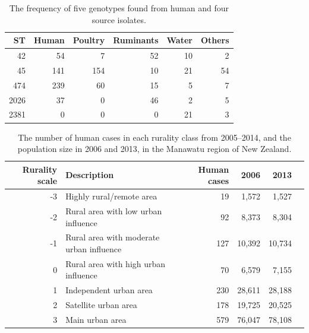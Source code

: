 \documentclass[AMA,STIX1COL]{WileyNJD-v2}
\begin{document}
\begin{table}
  \begin{center}
    \begin{tabular}{rrrrrr}
      \toprule
      ST & Human & Poultry & Ruminants & Water & Others\\ \midrule
      42 & 54 & 7 & 52 & 10 & 2\\
      45  & 141 & 154 & 10 & 21 & 54\\
      474 & 239 & 60 & 15 & 5 & 7\\
      2026 & 37 & 0 & 46 & 2 & 5\\
      2381 & 0 & 0 & 0 & 21 & 3\\
      \bottomrule
    \end{tabular}
  \end{center}
  \caption{The frequency of five genotypes found from human and four source isolates.}
  \label{tab:counts}
\end{table}

\begin{table}
  \centering
      \begin{tabular}{rlrrrr}
        \toprule
        Rurality scale & Description & Human cases & 2006 & 2013 \\ \midrule
        -3 & Highly rural/remote area & 19 & 1,572 & 1,527\\
        -2 & Rural area with low urban influence & 92 & 8,373 & 8,304\\
        -1 & Rural area with moderate urban influence & 127 & 10,392 & 10,734\\
        0 & Rural area with high urban influence & 70 & 6,579 & 7,155\\
        1 & Independent urban area & 230 & 28,611 & 28,188\\
        2 & Satellite urban area & 178 & 19,725 & 20,525\\
        3 & Main urban area & 579 & 76,047 & 78,108\\
        \bottomrule
      \end{tabular}
      \caption{The number of human cases in each rurality class from 2005--2014, and the population size in 2006 and 2013, in the Manawatu region of New Zealand.}
      \label{tab:rurality}
\end{table}
\end{document}
